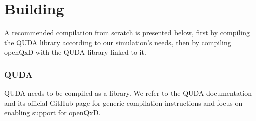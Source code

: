\chapter{Building}
\label{ch:p1:building}






A recommended compilation from scratch is presented below, first by compiling the QUDA library according to our simulation's needs, then by compiling openQxD with the QUDA library linked to it.

\subsection{QUDA}
\label{sec:building:quda}

QUDA needs to be compiled as a library. We refer to the QUDA documentation \cite{QUDApaper} and its official GitHub page \cite{github:quda} for generic compilation instructions and focus on enabling support for openQxD.


